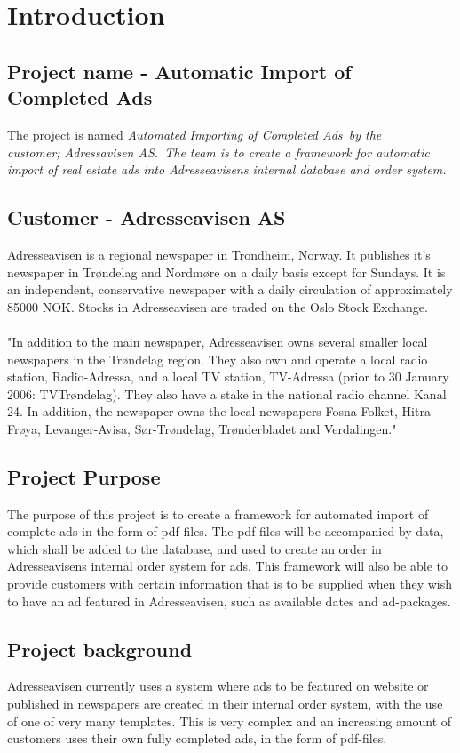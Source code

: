 \section{Introduction}
\subsection{Project name - Automatic Import of Completed Ads}
The project is named \em Automated Importing of Completed Ads\em \ by the \\
customer; \em Adressavisen AS.\em \ The team is to create a framework for automatic import of real estate ads
into Adresseavisens internal database and order system.
\subsection{Customer - Adresseavisen AS}
Adresseavisen is a regional newspaper in Trondheim, Norway. It publishes it's newspaper in Trøndelag and Nordmøre on a daily basis except for Sundays. It is an independent, conservative newspaper with a daily circulation of approximately 85000 NOK. 
Stocks in Adresseavisen are traded on the Oslo Stock Exchange.\\
\\
"In addition to the main newspaper, Adresseavisen owns several smaller local newspapers in the Trøndelag region. They also own and operate a local radio station, Radio-Adressa, and a local TV station, TV-Adressa (prior to 30 January 2006: TVTrøndelag). They also have a stake in the national radio channel Kanal 24. In addition, the newspaper owns the local newspapers Fosna-Folket, Hitra-Frøya, Levanger-Avisa, Sør-Trøndelag, Trønderbladet and Verdalingen." \cite{adressaWiki}

\subsection{Project Purpose}
The purpose of this project is to create a framework for automated import of complete ads in the form of pdf-files. The pdf-files will be accompanied by data, which shall be added to the database, and used to create an order in Adresseavisens internal order system for ads. This framework will also be able to provide customers with certain information that is to be supplied when they wish to have an ad featured in Adresseavisen, such as available dates and ad-packages.

\subsection{Project background}
Adresseavisen currently uses a system where ads to be featured on website or published in newspapers are created in their internal order system, with the use of one of very many templates. This is very complex and an increasing amount of customers uses their own fully completed ads, in the form of pdf-files.

